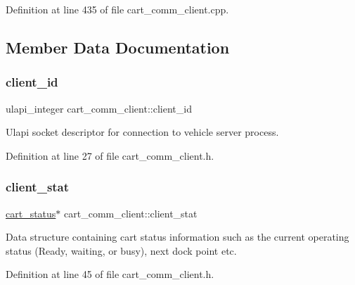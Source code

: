Definition at line 435 of file cart\+\_\+comm\+\_\+client.\+cpp.



\subsection{Member Data Documentation}
\mbox{\label{classcart__comm__client_a40e8d8cb8282a11b418a63a777d8e975}} 
\subsubsection{\texorpdfstring{client\+\_\+id}{client\_id}}
{\footnotesize\ttfamily ulapi\+\_\+integer cart\+\_\+comm\+\_\+client\+::client\+\_\+id\hspace{0.3cm}{\ttfamily [private]}}

Ulapi socket descriptor for connection to vehicle server process. 

Definition at line 27 of file cart\+\_\+comm\+\_\+client.\+h.

\mbox{\label{classcart__comm__client_abaecd6fff514a7e5897f45ec7c9815c9}} 
\subsubsection{\texorpdfstring{client\+\_\+stat}{client\_stat}}
{\footnotesize\ttfamily \mbox{\hyperlink{classcart__status}{cart\+\_\+status}}$\ast$ cart\+\_\+comm\+\_\+client\+::client\+\_\+stat\hspace{0.3cm}{\ttfamily [private]}}

Data structure containing cart status information such as the current operating status (Ready, waiting, or busy), next dock point etc. 

Definition at line 45 of file cart\+\_\+comm\+\_\+client.\+h.

\mbox{\label{classcart__comm__client_a4be5bd4f9f71038a43ec454d8370583a}} 
